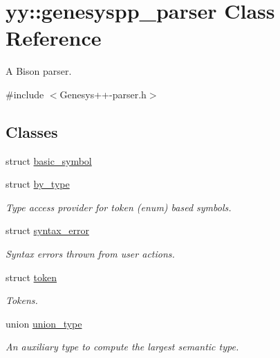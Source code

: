 \hypertarget{classyy_1_1genesyspp__parser}{\section{yy\-:\-:genesyspp\-\_\-parser Class Reference}
\label{classyy_1_1genesyspp__parser}
}


A Bison parser.  




{\ttfamily \#include $<$Genesys++-\/parser.\-h$>$}

\subsection*{Classes}
\begin{DoxyCompactItemize}
\item 
struct \hyperlink{structyy_1_1genesyspp__parser_1_1basic__symbol}{basic\-\_\-symbol}
\item 
struct \hyperlink{structyy_1_1genesyspp__parser_1_1by__type}{by\-\_\-type}
\begin{DoxyCompactList}\small\item\em Type access provider for token (enum) based symbols. \end{DoxyCompactList}\item 
struct \hyperlink{structyy_1_1genesyspp__parser_1_1syntax__error}{syntax\-\_\-error}
\begin{DoxyCompactList}\small\item\em Syntax errors thrown from user actions. \end{DoxyCompactList}\item 
struct \hyperlink{structyy_1_1genesyspp__parser_1_1token}{token}
\begin{DoxyCompactList}\small\item\em Tokens. \end{DoxyCompactList}\item 
union \hyperlink{unionyy_1_1genesyspp__parser_1_1union__type}{union\-\_\-type}
\begin{DoxyCompactList}\small\item\em An auxiliary type to compute the largest semantic type. \end{DoxyCompactList}\end{DoxyCompactItemize}
